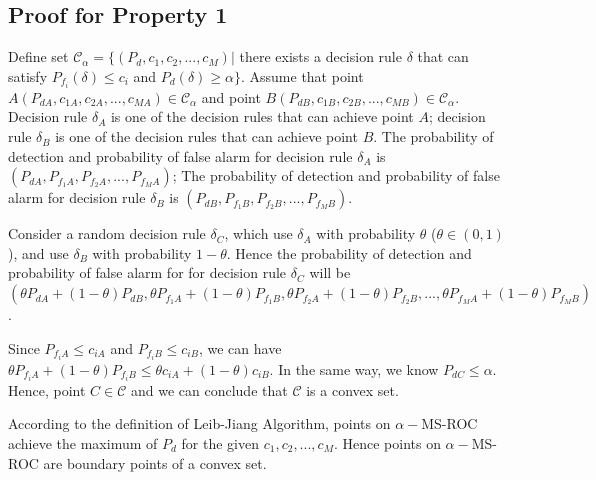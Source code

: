 \documentclass[12pt,journal,a4paper,twoside,doublecolumn]{IEEEtran}
\begin{document}
\begin{spacing}{1.0}
\subsection{Proof for Property 1}
Define set $\mathcal{C}_\alpha = \{
(P_d, c_1, c_2, ..., c_M)|$ there exists a decision rule $\delta$ that can satisfy $P_{f_i}(\delta) \leq c_i$  and $P_d(\delta) \geq \alpha
\}$.
Assume that point $A(P_{dA}, c_{1A}, c_{2A}, ..., c_{MA}) \in \mathcal{C}_\alpha$ and point $B(P_{dB}, c_{1B}, c_{2B}, ..., c_{MB}) \in \mathcal{C}_\alpha$. Decision rule $\delta_A$ is one of the decision rules that can achieve point $A$; decision rule $\delta_B$ is one of the decision rules that can achieve point $B$. The probability of detection and probability of false alarm for decision rule $\delta_A$ is $(P_{dA}, P_{f_1A}, P_{f_2A}, ..., P_{f_MA})$; The probability of detection and probability of false alarm for decision rule $\delta_B$ is $(P_{dB}, P_{f_1B}, P_{f_2B}, ..., P_{f_MB})$.

Consider a random decision rule $\delta_C$, which use $\delta_A$ with probability $\theta$ ($\theta \in (0, 1)$), and use $\delta_B$ with probability $1 - \theta$. Hence the probability of detection and probability of false alarm for for decision rule $\delta_C$ will be $(\theta P_{dA} + (1 - \theta)P_{dB}, \theta P_{f_1A} + (1 - \theta)P_{f_1B}, \theta P_{f_2A} + (1 - \theta)P_{f_2B}, ..., \theta P_{f_MA} + (1 - \theta)P_{f_MB})$.

Since $P_{f_iA} \leq c_{iA}$ and $P_{f_iB} \leq c_{iB}$, we can have $\theta P_{f_iA} + (1 - \theta)P_{f_iB} \leq \theta c_{iA} + (1 - \theta)c_{iB}$. In the same way, we know $P_{dC} \leq \alpha$. Hence, point $C \in \mathcal{C}$ and  we can conclude that $\mathcal{C}$ is a convex set.

According to the definition of Leib-Jiang Algorithm, points on $\alpha-$MS-ROC achieve the maximum of $P_d$ for the given $c_1, c_2, ..., c_M$. Hence points on  $\alpha-$MS-ROC are boundary points of  a convex set.


\end{spacing}
\end{document}
